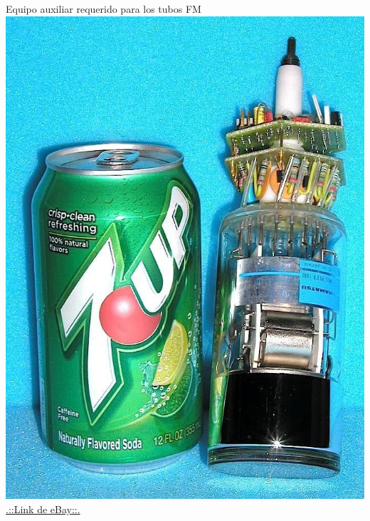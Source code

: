 \documentclass[a4paper,10pt]{beamer}
\begin{document}
\begin{frame}
\begin{center}
 {\Huge{\color{blue}Equipo auxiliar requerido para los tubos FM}} \\
 \vspace{0.5cm}
 \includegraphics[scale=0.25]{fig29}
 \hspace{.3cm} \href{http://www.ebay.com/itm/HAMAMATSU-2-0-INCH-PHOTOMULTIPLIER-TUBE-/351425074352}{\color{blue}.::Link de eBay::.}
\end{center}
\end{frame}
\end{document}
